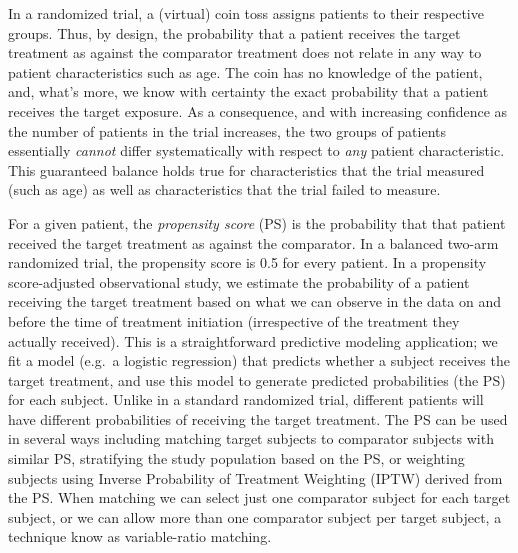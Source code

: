 \documentclass[11pt]{book}
\theoremstyle{definition}
\theoremstyle{definition}
\theoremstyle{definition}
\theoremstyle{remark}
\begin{document}

In a randomized trial, a (virtual) coin toss assigns patients to their respective groups. Thus, by design, the probability that a patient receives the target treatment as against the comparator treatment does not relate in any way to patient characteristics such as age. The coin has no knowledge of the patient, and, what's more, we know with certainty the exact probability that a patient receives the target exposure. As a consequence, and with increasing confidence as the number of patients in the trial increases, the two groups of patients essentially \emph{cannot} differ systematically with respect to \emph{any} patient characteristic. This guaranteed balance holds true for characteristics that the trial measured (such as age) as well as characteristics that the trial failed to measure. 

For a given patient, the \emph{propensity score} (PS) is the probability that that patient received the target treatment as against the comparator. \citep{rosenbaum_1983} In a balanced two-arm randomized trial, the propensity score is 0.5 for every patient. In a propensity score-adjusted observational study, we estimate the probability of a patient receiving the target treatment based on what we can observe in the data on and before the time of treatment initiation (irrespective of the treatment they actually received). This is a straightforward predictive modeling application; we fit a model (e.g.~a logistic regression) that predicts whether a subject receives the target treatment, and use this model to generate predicted probabilities (the PS) for each subject. Unlike in a standard randomized trial, different patients will have different probabilities of receiving the target treatment. The PS can be used in several ways including matching target subjects to comparator subjects with similar PS, stratifying the study population based on the PS, or weighting subjects using Inverse Probability of Treatment Weighting (IPTW) derived from the PS. When matching we can select just one comparator subject for each target subject, or we can allow more than one comparator subject per target subject, a technique know as variable-ratio matching. \citep{rassen_2012}      
\end{document}
